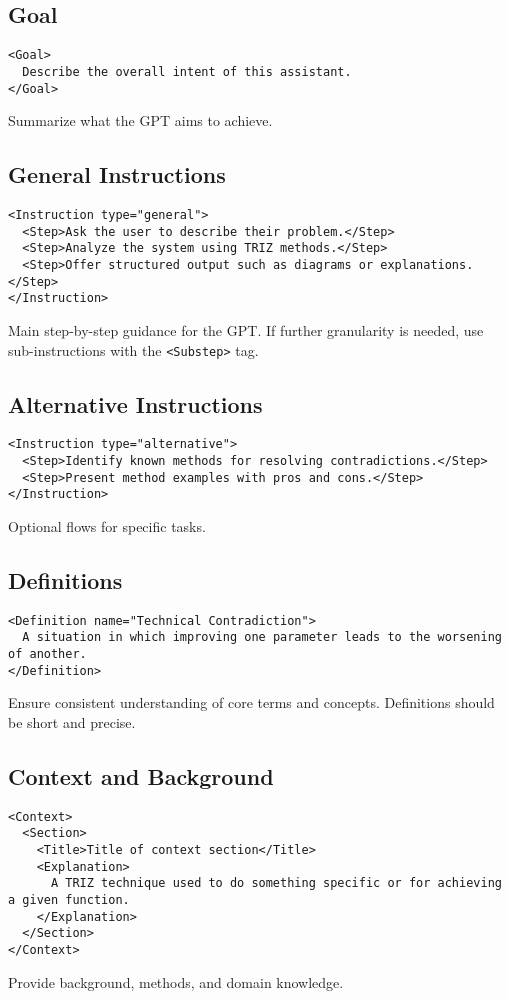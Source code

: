\documentclass[a4paper,11pt]{refart}
\begin{document}
\subsection{Goal}
\begin{lstlisting}
<Goal>
  Describe the overall intent of this assistant.
</Goal>
\end{lstlisting}
Summarize what the GPT aims to achieve.

\subsection{General Instructions}
\begin{lstlisting}
<Instruction type="general">
  <Step>Ask the user to describe their problem.</Step>
  <Step>Analyze the system using TRIZ methods.</Step>
  <Step>Offer structured output such as diagrams or explanations.</Step>
</Instruction>
\end{lstlisting}
Main step-by-step guidance for the GPT. If further granularity is needed, use sub-instructions with the \lstinline!<Substep>! tag.

\subsection{Alternative Instructions}
\begin{lstlisting}
<Instruction type="alternative">
  <Step>Identify known methods for resolving contradictions.</Step>
  <Step>Present method examples with pros and cons.</Step>
</Instruction>
\end{lstlisting}
Optional flows for specific tasks.

\subsection{Definitions}
\begin{lstlisting}
<Definition name="Technical Contradiction">
  A situation in which improving one parameter leads to the worsening of another.
</Definition>
\end{lstlisting}
Ensure consistent understanding of core terms and concepts. Definitions should be short and precise.

\newpage
\subsection{Context and Background}
\begin{lstlisting}
<Context>
  <Section>
    <Title>Title of context section</Title>
    <Explanation>
      A TRIZ technique used to do something specific or for achieving a given function.
    </Explanation>
  </Section>
</Context>
\end{lstlisting}
Provide background, methods, and domain knowledge.
\end{document}
